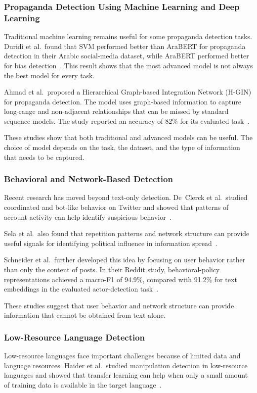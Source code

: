 \subsubsection*{Propaganda Detection Using Machine Learning and Deep Learning}
Traditional machine learning remains useful for some propaganda detection tasks.
Duridi et al.\ found that SVM performed better than AraBERT for propaganda
detection in their Arabic social-media dataset, while AraBERT performed better for
bias detection~\cite{duridi2025}. This result shows that the most advanced model is
not always the best model for every task.

Ahmad et al.\ proposed a Hierarchical Graph-based Integration Network (H-GIN) for
propaganda detection. The model uses graph-based information to capture long-range
and non-adjacent relationships that can be missed by standard sequence models. The
study reported an accuracy of 82\% for its evaluated task~\cite{ahmad2025}.

These studies show that both traditional and advanced models can be useful. The
choice of model depends on the task, the dataset, and the type of information that
needs to be captured.

\subsubsection*{Behavioral and Network-Based Detection}
Recent research has moved beyond text-only detection. De~Clerck et al.\ studied
coordinated and bot-like behavior on Twitter and showed that patterns of account
activity can help identify suspicious behavior~\cite{declerck2024}.

Sela et al.\ also found that repetition patterns and network structure can provide
useful signals for identifying political influence in information
spread~\cite{sela2025}.

Schneider et al.\ further developed this idea by focusing on user behavior rather
than only the content of posts. In their Reddit study, behavioral-policy
representations achieved a macro-F1 of 94.9\%, compared with 91.2\% for text
embeddings in the evaluated actor-detection task~\cite{schneider2026}.

These studies suggest that user behavior and network structure can provide
information that cannot be obtained from text alone.

\subsubsection*{Low-Resource Language Detection}
Low-resource languages face important challenges because of limited data and
language resources. Haider et al.\ studied manipulation detection in low-resource
languages and showed that transfer learning can help when only a small amount of
training data is available in the target language~\cite{haider2020}.

